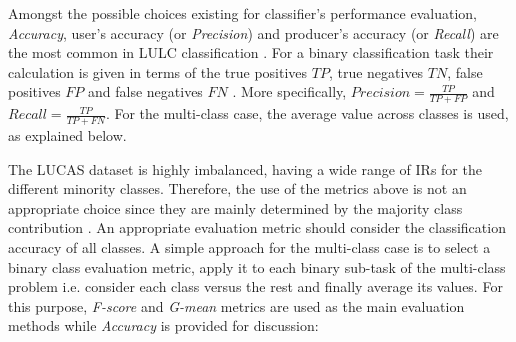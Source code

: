 \documentclass[remotesensing,article,submit,moreauthors,pdftex]{Definitions/mdpi}
\begin{document}
Amongst the possible choices existing for classifier's performance evaluation,
\textit{Accuracy}, user's accuracy (or \textit{Precision}) and
producer's accuracy (or \textit{Recall}) are the most common in LULC
classification \cite{Liu2007, Olofsson2013}. For a binary classification task
their calculation is given in terms of the true positives \( TP \), true
negatives \(TN \), false positives \( FP \) and false negatives \( FN \)
\cite{Liu2007}. More specifically,  \( \textit{Precision} =  \frac{TP}{TP + FP}
\) and \(\textit{Recall} =  \frac{TP}{TP + FN} \). For the multi-class case, the
average value across classes is used, as explained below. 

The LUCAS dataset is highly imbalanced, having a wide range of IRs for the
different minority classes. Therefore, the use of the metrics above is not an
appropriate choice since they are mainly determined by the majority class
contribution \cite{He2009}. An appropriate evaluation metric should consider the
classification accuracy of all classes. A simple approach for the multi-class
case is to select a binary class evaluation metric, apply it to each binary
sub-task of the multi-class problem i.e. consider each class versus the rest and
finally average its values. For this purpose, \textit{F-score} and
\textit{G-mean} metrics are used as the main evaluation methods while
\textit{Accuracy} is provided for discussion:
\end{document}
